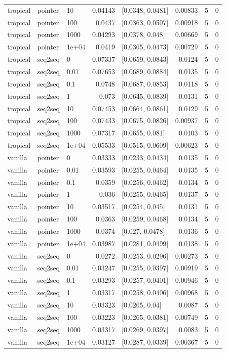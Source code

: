 \documentclass[10pt]{article}
\begin{document}
{\begin{longtable}{lllrlrrr}
tropical & pointer & 10 & 0.04143 & [0.0348, 0.0481] & 0.00833 & 5 & 0\\
tropical & pointer & 100 & 0.0437 & [0.0363, 0.0507] & 0.00918 & 5 & 0\\
tropical & pointer & 1000 & 0.04293 & [0.0378, 0.048] & 0.00669 & 5 & 0\\
tropical & pointer & 1e+04 & 0.0419 & [0.0365, 0.0473] & 0.00729 & 5 & 0\\
tropical & seq2seq & 0 & 0.07337 & [0.0659, 0.0843] & 0.0124 & 5 & 0\\
tropical & seq2seq & 0.01 & 0.07653 & [0.0689, 0.0884] & 0.0135 & 5 & 0\\
tropical & seq2seq & 0.1 & 0.0748 & [0.0687, 0.0853] & 0.0118 & 5 & 0\\
tropical & seq2seq & 1 & 0.073 & [0.0645, 0.0839] & 0.0131 & 5 & 0\\
tropical & seq2seq & 10 & 0.07453 & [0.0664, 0.0861] & 0.0129 & 5 & 0\\
tropical & seq2seq & 100 & 0.07433 & [0.0675, 0.0826] & 0.00937 & 5 & 0\\
tropical & seq2seq & 1000 & 0.07317 & [0.0655, 0.081] & 0.0103 & 5 & 0\\
tropical & seq2seq & 1e+04 & 0.05533 & [0.0515, 0.0609] & 0.00623 & 5 & 0\\
vanilla & pointer & 0 & 0.03333 & [0.0233, 0.0434] & 0.0135 & 5 & 0\\
vanilla & pointer & 0.01 & 0.03593 & [0.0255, 0.0464] & 0.0135 & 5 & 0\\
vanilla & pointer & 0.1 & 0.0359 & [0.0256, 0.0462] & 0.0134 & 5 & 0\\
vanilla & pointer & 1 & 0.036 & [0.0255, 0.0465] & 0.0137 & 5 & 0\\
vanilla & pointer & 10 & 0.03517 & [0.0254, 0.045] & 0.0131 & 5 & 0\\
vanilla & pointer & 100 & 0.0363 & [0.0259, 0.0468] & 0.0134 & 5 & 0\\
vanilla & pointer & 1000 & 0.0374 & [0.027, 0.0478] & 0.0136 & 5 & 0\\
vanilla & pointer & 1e+04 & 0.03987 & [0.0281, 0.0499] & 0.0138 & 5 & 0\\
vanilla & seq2seq & 0 & 0.0272 & [0.0253, 0.0296] & 0.00273 & 5 & 0\\
vanilla & seq2seq & 0.01 & 0.03247 & [0.0255, 0.0397] & 0.00919 & 5 & 0\\
vanilla & seq2seq & 0.1 & 0.03293 & [0.0257, 0.0401] & 0.00946 & 5 & 0\\
vanilla & seq2seq & 1 & 0.03317 & [0.0258, 0.0406] & 0.00968 & 5 & 0\\
vanilla & seq2seq & 10 & 0.03323 & [0.0265, 0.04] & 0.0087 & 5 & 0\\
vanilla & seq2seq & 100 & 0.03223 & [0.0265, 0.0381] & 0.00749 & 5 & 0\\
vanilla & seq2seq & 1000 & 0.03317 & [0.0269, 0.0397] & 0.0083 & 5 & 0\\
vanilla & seq2seq & 1e+04 & 0.03127 & [0.0287, 0.0339] & 0.00367 & 5 & 0\\
\bottomrule
\end{longtable}
}
\end{document}
